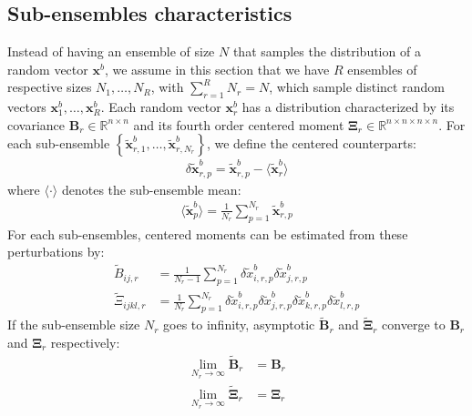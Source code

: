 \documentclass[12pt]{scrartcl}
\begin{document}
\subsection{Sub-ensembles characteristics}
Instead of having an ensemble of size $N$ that samples the distribution of a random vector $\mathbf{x}^b$, we assume in this section that we have $R$ ensembles of respective sizes $N_1,\dots,N_R$, with $\sum_{r=1}^R N_r = N$, which sample distinct random vectors $\mathbf{x}^b_1,\dots,\mathbf{x}^b_R$. Each random vector $\mathbf{x}^b_r$ has a distribution characterized by its covariance $\mathbf{B}_r \in \mathbb{R}^{n \times n}$ and its fourth order centered moment $\boldsymbol{\Xi}_r \in \mathbb{R}^{n \times n \times n \times n}$. For each sub-ensemble $\left\{\widetilde{\mathbf{x}}^b_{r,1},\dots,\widetilde{\mathbf{x}}^b_{r,N_r}\right\}$, we define the centered counterparts:
\begin{align}
\delta \widetilde{\mathbf{x}}^b_{r,p} = \widetilde{\mathbf{x}}^b_{r,p} - \langle \widetilde{\mathbf{x}}^b _r\rangle
\end{align}
where $\langle \cdot \rangle$ denotes the sub-ensemble mean:
\begin{align}
\langle \widetilde{\mathbf{x}}^b_p \rangle = \frac{1}{N_r} \sum_{p=1}^{N_r} \widetilde{\mathbf{x}}^b_{r,p}
\end{align}
For each sub-ensembles, centered moments can be estimated from these perturbations by:
\begin{subequations}
\begin{align}
\widetilde{B}_{ij,r} & = \frac{1}{N_r-1} \sum_{p=1}^{N_r} \delta \widetilde{x}^b_{i,r,p} \delta \widetilde{x}^b_{j,r,p}  \\
\widetilde{\Xi}_{ijkl,r} & = \frac{1}{N_r} \sum_{p=1}^{N_r} \delta \widetilde{x}^b_{i,r,p} \delta \widetilde{x}^b_{j,r,p} \delta \widetilde{x}^b_{k,r,p} \delta \widetilde{x}^b_{l,r,p}
\end{align}
\end{subequations}
$  $\\
If the sub-ensemble size $N_r$ goes to infinity, asymptotic $\widetilde{\mathbf{B}}_r$ and $\widetilde{\boldsymbol{\Xi}}_r$ converge to $\mathbf{B}_r$ and $\boldsymbol{\Xi}_r$ respectively:
\begin{subequations}
\begin{align}
\lim_{N_r \rightarrow \infty} \widetilde{\mathbf{B}}_r & = \mathbf{B}_r \\
\lim_{N_r \rightarrow \infty} \widetilde{\boldsymbol{\Xi}}_r & = \boldsymbol{\Xi}_r
\end{align}
\end{subequations}
\end{document}
